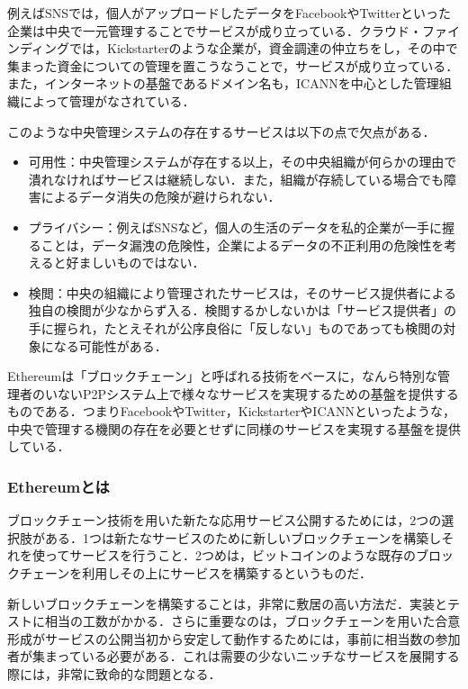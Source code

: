 例えばSNSでは，個人がアップロードしたデータをFacebookやTwitterといった企業は中央で一元管理することでサービスが成り立っている．クラウド・ファインディングでは，Kickstarterのような企業が，資金調達の仲立ちをし，その中で集まった資金についての管理を置こうなうことで，サービスが成り立っている．また，インターネットの基盤であるドメイン名も，ICANNを中心とした管理組織によって管理がなされている．

このような中央管理システムの存在するサービスは以下の点で欠点がある．

\begin{itemize}
\item 可用性：中央管理システムが存在する以上，その中央組織が何らかの理由で潰れなければサービスは継続しない．また，組織が存続している場合でも障害によるデータ消失の危険が避けられない．

\item プライバシー：例えばSNSなど，個人の生活のデータを私的企業が一手に握ることは，データ漏洩の危険性，企業によるデータの不正利用の危険性を考えると好ましいものではない．

\item 検閲：中央の組織により管理されたサービスは，そのサービス提供者による独自の検閲が少なからず入る．検閲するかしないかは「サービス提供者」の手に握られ，たとえそれが公序良俗に「反しない」ものであっても検閲の対象になる可能性がある．
\end{itemize}

Ethereumは「ブロックチェーン」と呼ばれる技術をベースに，なんら特別な管理者のいないP2Pシステム上で様々なサービスを実現するための基盤を提供するものである．つまりFacebookやTwitter，KickstarterやICANNといったような，中央で管理する機関の存在を必要とせずに同様のサービスを実現する基盤を提供している．

\newpage
\subsubsection{Ethereumとは}
ブロックチェーン技術を用いた新たな応用サービス公開するためには，2つの選択肢がある．1つは新たなサービスのために新しいブロックチェーンを構築しそれを使ってサービスを行うこと．2つめは，ビットコインのような既存のブロックチェーンを利用しその上にサービスを構築するというものだ．

新しいブロックチェーンを構築することは，非常に敷居の高い方法だ．実装とテストに相当の工数がかかる．さらに重要なのは，ブロックチェーンを用いた合意形成がサービスの公開当初から安定して動作するためには，事前に相当数の参加者が集まっている必要がある．これは需要の少ないニッチなサービスを展開する際には，非常に致命的な問題となる．

